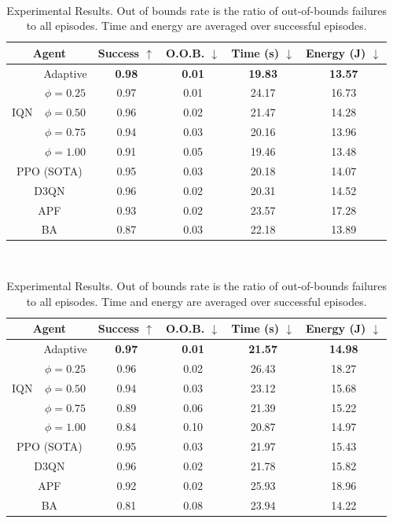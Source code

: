 \begin{table}[t]
\centering
\caption{Experimental Results. Out of bounds rate is the ratio of out-of-bounds failures to all episodes. Time and energy are averaged over successful episodes.}
\label{tab:combined_results}
\setlength{\tabcolsep}{3pt}
\renewcommand{\arraystretch}{1.1}

\\ \vspace{2pt}
\begin{tabular*}{\linewidth}{@{\extracolsep{\fill}}l|c|cccc@{}}
\hline
\multicolumn{2}{c|}{Agent} & Success $\uparrow$ & O.O.B. $\downarrow$ & Time (s) $\downarrow$ & Energy (J) $\downarrow$ \\
\hline
\multirow{5}{*}{IQN} & Adaptive & \textbf{0.98} & \textbf{0.01} & \textbf{19.83} & \textbf{13.57} \\
& $\phi=0.25$ & 0.97 & 0.01 & 24.17 & 16.73 \\
& $\phi=0.50$ & 0.96 & 0.02 & 21.47 & 14.28 \\
& $\phi=0.75$ & 0.94 & 0.03 & 20.16 & 13.96 \\
& $\phi=1.00$ & 0.91 & 0.05 & 19.46 & 13.48 \\
\hline
\multicolumn{2}{c|}{PPO (SOTA)} & 0.95 & 0.03 & 20.18 & 14.07 \\
\multicolumn{2}{c|}{D3QN} & 0.96 & 0.02 & 20.31 & 14.52 \\
\multicolumn{2}{c|}{APF} & 0.93 & 0.02 & 23.57 & 17.28 \\
\multicolumn{2}{c|}{BA} & 0.87 & 0.03 & 22.18 & 13.89 \\
\hline
\end{tabular*}

\vspace{1em}

\\ \vspace{2pt}
\begin{tabular*}{\linewidth}{@{\extracolsep{\fill}}l|c|cccc@{}}
\hline
\multicolumn{2}{c|}{Agent} & Success $\uparrow$ & O.O.B. $\downarrow$ & Time (s) $\downarrow$ & Energy (J) $\downarrow$ \\
\hline
\multirow{5}{*}{IQN} & Adaptive & \textbf{0.97} & \textbf{0.01} & \textbf{21.57} & \textbf{14.98} \\
& $\phi=0.25$ & 0.96 & 0.02 & 26.43 & 18.27 \\
& $\phi=0.50$ & 0.94 & 0.03 & 23.12 & 15.68 \\
& $\phi=0.75$ & 0.89 & 0.06 & 21.39 & 15.22 \\
& $\phi=1.00$ & 0.84 & 0.10 & 20.87 & 14.97 \\
\hline
\multicolumn{2}{c|}{PPO (SOTA)} & 0.95 & 0.03 & 21.97 & 15.43 \\
\multicolumn{2}{c|}{D3QN} & 0.96 & 0.02 & 21.78 & 15.82 \\
\multicolumn{2}{c|}{APF} & 0.92 & 0.02 & 25.93 & 18.96 \\
\multicolumn{2}{c|}{BA} & 0.81 & 0.08 & 23.94 & 14.22 \\
\hline
\end{tabular*}
\end{table}

